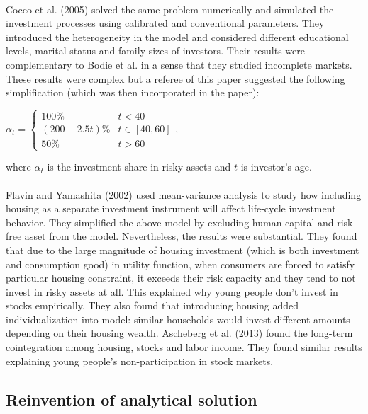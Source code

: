 \documentclass[]{article}
\begin{document}
\paragraph*{}Cocco et al. (2005) solved the same problem numerically and simulated the investment processes using calibrated and conventional parameters. They introduced the heterogeneity in the model and considered different educational levels, marital status and family sizes of investors. Their results were complementary to Bodie et al. in a sense that they studied incomplete markets. These results were complex but a referee of this paper suggested the following simplification (which was then incorporated in the paper):

\begin{center}
	$\alpha_t = \begin{cases} 100\% & t<40\\(200-2.5t)\% & t\in[40,60]\\50\% & t>60 \end{cases}$,
\end{center}

where $\alpha_t$ is the investment share in risky assets and $t$ is investor's age.

\paragraph*{}Flavin and Yamashita (2002) used mean-variance analysis to study how including housing as a separate investment instrument will affect life-cycle investment behavior. They simplified the above model by excluding human capital and risk-free asset from the model. Nevertheless, the results were substantial. They found that due to the large magnitude of housing investment (which is both investment and consumption good) in utility function, when consumers are forced to satisfy particular housing constraint, it exceeds their risk capacity and they tend to not invest in risky assets at all. This explained why young people don't invest in stocks empirically. They also found that introducing housing added individualization into model: similar households would invest different amounts depending on their housing wealth. Ascheberg et al. (2013) found the long-term cointegration among housing, stocks and labor income. They found similar results explaining young people's non-participation in stock markets. 



\subsection{Reinvention of analytical solution}
\end{document}
